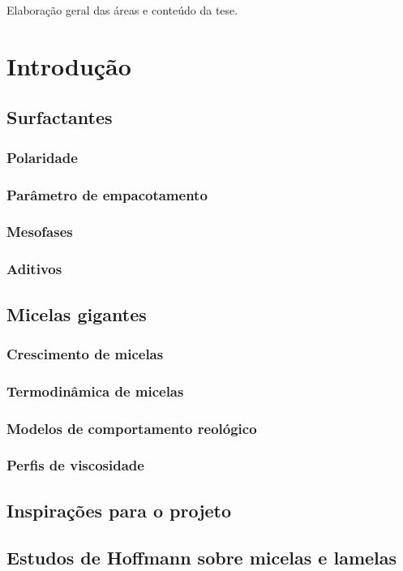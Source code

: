 \documentclass[a4paper, 10pt]{book}
\begin{document}
	
	\tableofcontents
	
Elaboração geral das áreas e conteúdo da tese.
	
\part{Introdução}
	\chapter{Surfactantes}
		\section{Polaridade}
		\section{Parâmetro de empacotamento}
		\section{Mesofases}
		\section{Aditivos}
	\chapter{Micelas gigantes}
		\section{Crescimento de micelas}
		\section{Termodinâmica de micelas}
		\section{Modelos de comportamento reológico}
		\section{Perfis de viscosidade}
	\chapter{Inspirações para o projeto}
		\chapter{Estudos de Hoffmann sobre micelas e lamelas}
\end{document}
